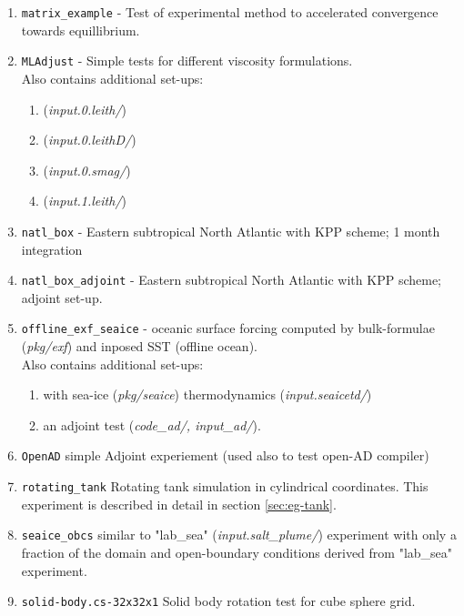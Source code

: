 \begin{enumerate}
\item \texttt{matrix\_example} - Test of experimental method to
  accelerated convergence towards equillibrium.

\item \texttt{MLAdjust} - Simple tests for different viscosity formulations.\\
  Also contains additional set-ups:
  \begin{enumerate}
   \item ({\it input.0.leith/})
   \item ({\it input.0.leithD/})
   \item ({\it input.0.smag/})
   \item ({\it input.1.leith/})
  \end{enumerate}

\item \texttt{natl\_box} - Eastern subtropical North Atlantic with KPP
  scheme; 1 month integration

\item \texttt{natl\_box\_adjoint} - Eastern subtropical North Atlantic with KPP
  scheme; adjoint set-up.

\item \texttt{offline\_exf\_seaice} - oceanic surface forcing computed
  by bulk-formulae ({\it pkg/exf}) and inposed SST (offline ocean).\\
  Also contains additional set-ups:
  \begin{enumerate}
   \item with sea-ice ({\it pkg/seaice}) thermodynamics ({\it input.seaicetd/})
   \item an adjoint test ({\it code\_ad/, input\_ad/}).
  \end{enumerate}
  
\item \texttt{OpenAD} simple Adjoint experiement (used also to test 
  open-AD compiler)

\item \texttt{rotating\_tank} Rotating tank simulation in cylindrical
  coordinates.  This experiment is described in detail in section
  \ref{sec:eg-tank}.

\item \texttt{seaice\_obcs} similar to "lab\_sea" ({\it input.salt\_plume/})
  experiment with only a fraction of the domain and open-boundary conditions
  derived from "lab\_sea" experiment.

\item \texttt{solid-body.cs-32x32x1} Solid body rotation test for cube
  sphere grid.


\end{enumerate}
